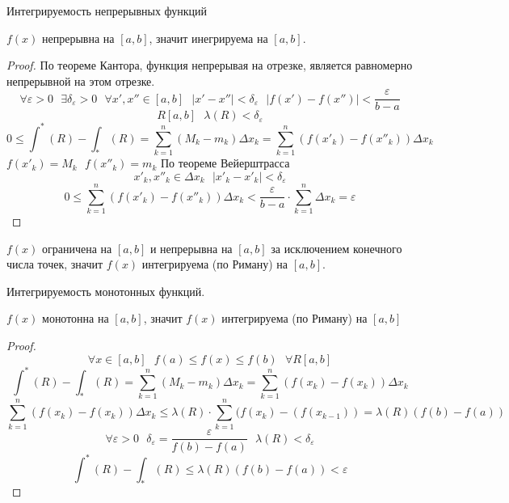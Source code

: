 \begin{title}[\Large]
  Интегрируемость непрерывных функций
\end{title}

\begin{theorem}
  $f(x)$ непрерывна на $[a,b]$, значит инегрируема на $[a,b]$.
\end{theorem}

\begin{proof}
  По теореме Кантора, функция непрерывая на отрезке, является равномерно
  непрерывной на этом отрезке.
  \[
    \forall \varepsilon > 0 ~~~ \exists \delta_\varepsilon > 0 ~~~ \forall
    x', x'' \in [a,b] ~~~ |x' - x''| < \delta_\varepsilon ~~~
    |f(x') - f(x'')| < \frac{\varepsilon}{b - a}
  \]
  \[R [a,b] ~~~ \lambda (R) < \delta_\varepsilon\]
  \[
    0 \le \int^* (R) - \int_* (R) = \sum_{k = 1}^{n} (M_k - m_k)
    \Delta x_k = \sum_{k = 1}^{n} (f(x'_k) - f(x''_k)) \Delta x_k
  \]
  $f(x'_k) = M_k ~~~ f(x''_k) = m_k$
  По теореме Вейерштрасса
  \[x'_k, x''_k \in \Delta x_k ~~~ |x'_k - x'_k| < \delta_\varepsilon\]
  \[
    0 \le \sum_{k = 1}^{n} (f(x'_k) - f(x''_k)) \Delta x_k <
    \frac{\varepsilon}{b - a} \cdot \sum_{k = 1}^{n} \Delta x_k = \varepsilon
  \]
\end{proof}

\begin{theorem}
  $f(x)$ ограничена на $[a,b]$ и непрерывна на $[a,b]$ за исключением конечного
  числа точек, значит $f(x)$ интегрируема (по Риману) на $[a,b]$.
\end{theorem}

\begin{title}[\Large]
  Интегрируемость монотонных функций.
\end{title}

\begin{theorem}
  $f(x)$ монотонна на $[a,b]$, значит $f(x)$ интегрируема (по Риману) на $[a,b]$
\end{theorem}

\begin{proof}
  \[\forall x \in [a,b] ~~~ f(a) \le f(x) \le f(b) ~~~ \forall R[a,b]\]
  \[
    \int^* (R) - \int_* (R) = \sum_{k = 1}^{n} (M_k - m_k) \Delta x_k
    = \sum_{k = 1}^{n} (f(x_k) - f(x_k)) \Delta x_k
  \]
  \[
    \sum_{k = 1}^{n} (f(x_k) - f(x_k)) \Delta x_k \le \lambda(R) \cdot
    \sum_{k = 1}^{n} (f(x_k) - (f(x_{k - 1})) = \lambda (R) (f(b) - f(a))
  \]
  \[
    \forall \varepsilon > 0 ~~~ \delta_\varepsilon = \frac{\varepsilon}{f(b) -
    f(a)} ~~~ \lambda (R) < \delta_\varepsilon
  \]
  \[\int^* (R) - \int_* (R) \le \lambda (R) (f(b) - f(a)) < \varepsilon\]
\end{proof}